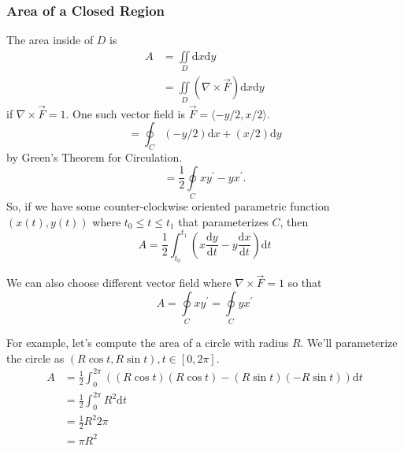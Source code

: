 \subsubsection{Area of a Closed Region}
\noindent
The area inside of $D$ is 
\begin{align*}
	A &= \iint\limits_{D}{\mathrm{d}x\mathrm{d}y} \\
	&= \iint\limits_{D}{\left(\nabla \times \vec{F}\right)\mathrm{d}x\mathrm{d}y}
\end{align*}
if $\nabla \times \vec{F} = 1$. One such vector field is $\vec{F} = \langle -y/2, x/2 \rangle$.
\begin{equation*}
	= \oint_{C}{(-y/2)\mathrm{d}x + (x/2)\mathrm{d}y}
\end{equation*}
by Green's Theorem for Circulation.
\begin{equation*}
	= \frac{1}{2}\oint\limits_{C}{xy^\prime - yx^\prime}.
\end{equation*}
So, if we have some counter-clockwise oriented parametric function $(x(t), y(t))$ where $t_0 \leq t \leq t_1$ that parameterizes $C$, then 
\begin{equation*}
	A = \frac{1}{2}\int_{t_0}^{t_1}{\left(x\frac{\mathrm{d}y}{\mathrm{d}t} - y\frac{\mathrm{d}x}{\mathrm{d}t}\right)\mathrm{d}t}
\end{equation*}

\noindent
We can also choose different vector field where $\nabla \times \vec{F} = 1$ so that
\begin{equation*}
	 A = \oint\limits_{C}{xy^\prime} = \oint\limits_{C}{yx^\prime}
\end{equation*}

\noindent
For example, let's compute the area of a circle with radius $R$.
We'll parameterize the circle as $(R\cos{t}, R\sin{t}), t \in [0,2\pi]$.\\
\begin{align*}
	A &= \frac{1}{2}\int_{0}^{2\pi}{((R\cos{t})(R\cos{t}) - (R\sin{t})(-R\sin{t}))\mathrm{d}t} \\
	&= \frac{1}{2}\int_{0}^{2\pi}{R^2\mathrm{d}t} \\
	&= \frac{1}{2}R^2 2\pi \\
	&= \pi R^2
\end{align*}